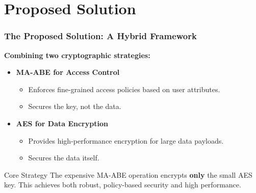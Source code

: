 \documentclass{beamer}
\begin{document}
\section{Proposed Solution}

\begin{frame}
\frametitle{The Proposed Solution: A Hybrid Framework}

\textbf{Combining two cryptographic strategies:}

\begin{itemize}
    \item \textbf{MA-ABE for Access Control}
    \begin{itemize}
        \item Enforces fine-grained access policies based on user attributes.
        \item Secures the key, not the data.
    \end{itemize}
    \item \textbf{AES for Data Encryption}
    \begin{itemize}
        \item Provides high-performance encryption for large data payloads.
        \item Secures the data itself.
    \end{itemize}
\end{itemize}

\begin{alertblock}{Core Strategy}
    The expensive MA-ABE operation encrypts \textbf{only} the small AES key. This achieves both robust, policy-based security and high performance.
\end{alertblock}

\end{frame}

\end{document}

